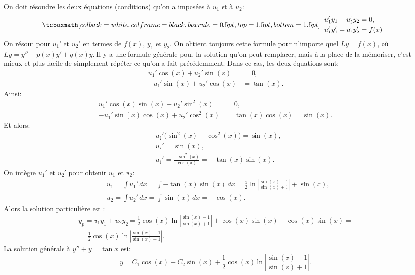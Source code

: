On doit résoudre les deux équations (conditions) qu'on a imposées à  $u_1$ et à $u_2$:
\begin{equation*}
\mybxbg{~~
\begin{aligned}
& u_1' y_1 + u_2' y_2 = 0 ,\\
& u_1' y_1' + u_2' y_2' = f(x) .
\end{aligned}
~~}
\end{equation*}
On résout pour $u_1'$ et $u_2'$ en termes de $f(x)$, $y_1$ et $y_2$.
On obtient toujours cette formule pour n'importe quel $Ly = f(x)$, où $Ly =
y''+p(x)y'+q(x)y$.  Il y a une formule générale pour la solution qu'on peut remplacer, mais à la place de la mémoriser, c'est mieux et plus facile de simplement répéter ce qu'on a fait précédemment. Dans ce cas, les deux équations sont:  
\begin{align*}
u_1' \cos (x) + u_2' \sin (x) &= 0 ,\\
-u_1' \sin (x) + u_2' \cos (x) &= \tan (x) .
\end{align*}
Ainsi: 
\begin{align*}
u_1' \cos (x) \sin (x) + u_2' \sin^2 (x) & = 0 ,\\
-u_1' \sin (x) \cos (x) + u_2' \cos^2 (x) & = \tan (x) \cos (x) = \sin (x) .
\end{align*}
Et alors: 
\begin{align*}
& u_2' \bigl(\sin^2 (x) + \cos^2 (x)\bigr) = \sin (x) , \\
& u_2' = \sin (x) , \\
& u_1' = \frac{- \sin^2 (x)}{\cos (x)} = - \tan (x) \sin (x) .
\end{align*}
On intègre $u_1'$ et $u_2'$ pour obtenir $u_1$ et $u_2$: 
\begin{align*}
& u_1 = \int u_1'\,dx 
= \int - \tan (x) \sin (x)\,dx
= \frac{1}{2}
\ln \left\lvert \frac{\sin (x)-1}{\sin (x) + 1} \right\rvert
+ \sin (x) , \\
& u_2 = \int u_2'\,dx 
= \int \sin (x)\,dx = -\cos (x) .
\end{align*}
Alors la solution particulière est : 
\begin{multline*}
y_p = u_1 y_1 + u_2 y_2 =
\frac{1}{2} \cos (x) \ln \left\lvert \frac{\sin (x)-1}{\sin (x) + 1}
\right\rvert
+ \cos (x) \sin (x)
-\cos (x) \sin (x)
= \\ =
\frac{1}{2} \cos (x) \ln \left\lvert \frac{\sin (x)-1}{\sin (x) + 1}
\right\rvert .
\end{multline*}
La solution générale à  $y'' + y = \tan x$ est: 
\begin{equation*}
y = C_1 \cos (x) + C_2 \sin (x) +
\frac{1}{2} \cos (x) \ln \left\lvert \frac{\sin (x)-1}{\sin (x) + 1}
\right\rvert .
\end{equation*}

